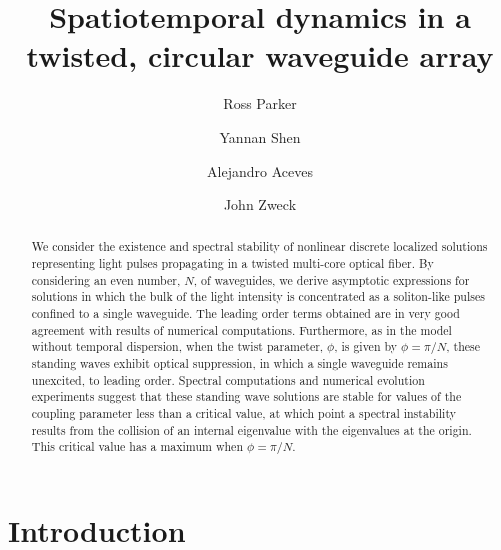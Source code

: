 \documentclass[11pt,reqno]{amsart}
\begin{document}
\title{Spatiotemporal dynamics in a twisted, circular waveguide array}

\author{Ross Parker}
\address{Department of Mathematics, Southern Methodist University, 
Dallas, TX 75275, USA}

\author{Yannan Shen} 
\address{Department of Mathematics, University of Kansas, Lawrence, KS 66045, USA}

\author{Alejandro Aceves}
\address{Department of Mathematics, Southern Methodist University, 
Dallas, TX 75275, USA}

\author{John Zweck}
\address{Department of Mathematics, The University of Texas at Dallas, 
Richardson, TX 75080, USA}

\begin{abstract}
We consider the existence and spectral stability of nonlinear discrete localized solutions representing light pulses propagating in a twisted multi-core optical fiber. By considering an even number, $N$, of waveguides, we derive asymptotic expressions for solutions in which the bulk of the light intensity is concentrated as a soliton-like pulses confined to a single waveguide. The leading order terms obtained are in very good agreement with results of numerical computations. Furthermore, as in the model without temporal dispersion, when the twist parameter, $\phi$, is given by $\phi = \pi/N$, these standing waves exhibit optical suppression, in which a single waveguide remains unexcited, to leading order. Spectral computations and numerical evolution experiments suggest that these standing wave solutions are stable for values of the coupling parameter less than a critical value, at which point a spectral instability results from the collision of an internal eigenvalue with the eigenvalues at the origin. This critical value has a maximum when $\phi = \pi/N$.
\end{abstract}

\maketitle

\section{Introduction}
\end{document}
